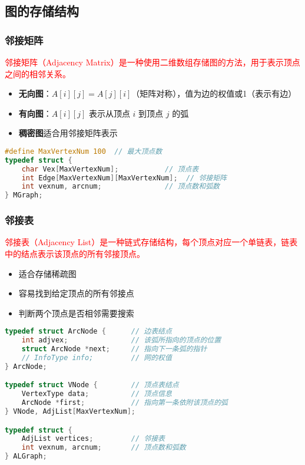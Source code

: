 \documentclass{../../note}
\begin{document}
\subsection{图的存储结构}

\subsubsection{邻接矩阵}

\textcolor{red}{邻接矩阵（Adjacency Matrix）是一种使用二维数组存储图的方法，用于表示顶点之间的相邻关系。}

\begin{itemize}
\item \textbf{无向图}：$A[i][j] = A[j][i]$（矩阵对称），值为边的权值或1（表示有边）
\item \textbf{有向图}：$A[i][j]$ 表示从顶点 $i$ 到顶点 $j$ 的弧
\item \textbf{稠密图}适合用邻接矩阵表示
\end{itemize}

\begin{lstlisting}[language=C]
#define MaxVertexNum 100  // 最大顶点数
typedef struct {
    char Vex[MaxVertexNum];           // 顶点表
    int Edge[MaxVertexNum][MaxVertexNum];  // 邻接矩阵
    int vexnum, arcnum;               // 顶点数和弧数
} MGraph;
\end{lstlisting}

\subsubsection{邻接表}

\textcolor{red}{邻接表（Adjacency List）是一种链式存储结构，每个顶点对应一个单链表，链表中的结点表示该顶点的所有邻接顶点。}

\begin{itemize}
\item 适合存储稀疏图
\item 容易找到给定顶点的所有邻接点
\item 判断两个顶点是否相邻需要搜索
\end{itemize}

\begin{lstlisting}[language=C]
typedef struct ArcNode {      // 边表结点
    int adjvex;               // 该弧所指向的顶点的位置
    struct ArcNode *next;     // 指向下一条弧的指针
    // InfoType info;         // 网的权值
} ArcNode;

typedef struct VNode {        // 顶点表结点
    VertexType data;          // 顶点信息
    ArcNode *first;           // 指向第一条依附该顶点的弧
} VNode, AdjList[MaxVertexNum];

typedef struct {
    AdjList vertices;         // 邻接表
    int vexnum, arcnum;       // 顶点数和弧数
} ALGraph;
\end{lstlisting}
\end{document}
